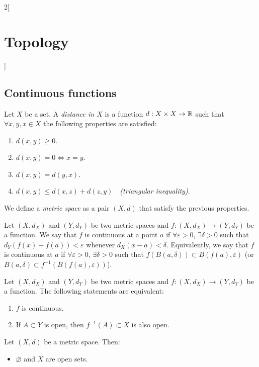\documentclass[../../../main.tex]{subfiles}
\begin{document}
\begin{multicols}{2}[\section{Topology}]
  \subsection{Continuous functions}
  \begin{definition}
    Let $X$ be a set. A \textit{distance in $X$} is a function $d:X\times X\rightarrow\mathbb{R} $ such that $\forall x,y,x\in X$ the following properties are satisfied:
    \begin{enumerate}
      \item $d(x,y)\geq 0$.
      \item $d(x,y)=0\iff x=y$.
      \item $d(x,y)=d(y,x)$.
      \item $d(x,y)\leq d(x,z)+d(z,y)\quad$\textit{(triangular inequality)}.
    \end{enumerate}
    We define a \textit{metric space} as a pair $(X,d)$ that satisfy the previous properties.
  \end{definition}
  \begin{definition}
    Let $(X,d_X)$ and $(Y,d_Y)$ be two metric spaces and $f:(X,d_X)\rightarrow(Y,d_Y)$ be a function. We say that $f$ is continuous at a point $a$ if $\forall\varepsilon>0$, $\exists\delta>0$ such that $d_Y(f(x)-f(a))<\varepsilon$ whenever $d_X(x-a)<\delta$. Equivalently, we say that $f$ is continuous at $a$ if $\forall\varepsilon>0$, $\exists\delta>0$ such that $f(B(a,\delta))\subset B(f(a),\varepsilon)$ (or $B(a,\delta)\subset f^{-1}\left(B(f(a),\varepsilon)\right)$).
  \end{definition}
  \begin{theorem}
    Let $(X,d_X)$ and $(Y,d_Y)$ be two metric spaces and $f:(X,d_X)\rightarrow(Y,d_Y)$ be a function. The following statements are equivalent:
    \begin{enumerate}
      \item $f$ is continuous.
      \item If $A\subset Y$ is open, then $f^{-1}(A)\subset X$ is also open.
    \end{enumerate}
  \end{theorem}
  \begin{prop}
    Let $(X,d)$ be a metric space. Then:
    \begin{itemize}
      \item $\varnothing$ and $X$ are open sets.

\end{itemize}
\end{prop}
\end{multicols}
\end{document}
